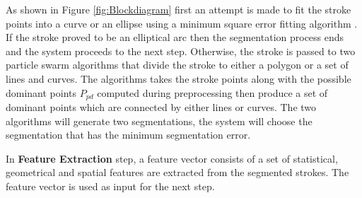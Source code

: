  As shown in Figure \ref{fig:Blockdiagram} first an attempt is made to fit the stroke points into a curve or an ellipse using a minimum square error fitting algorithm \cite{chernov-2003}. If the stroke proved to be an elliptical arc then the segmentation process ends and the system proceeds to the next step. Otherwise, the stroke is passed to two particle swarm algorithms that divide the stroke to either a polygon or a set of lines and curves. The algorithms takes the stroke points along with the possible dominant points $P_{pd}$ computed during preprocessing then produce a set of dominant points which are connected by either lines or curves. The two algorithms will generate two segmentations, the system will choose the segmentation that has the minimum segmentation error.%

 
 In \textbf{Feature Extraction} step, a feature vector consists of a set of statistical, geometrical and spatial features are extracted from the segmented strokes. The feature vector is used as input for the next step.   %
  
